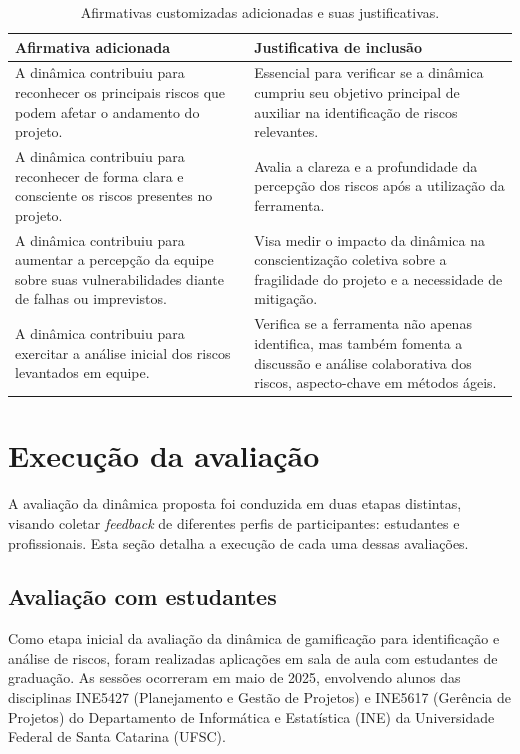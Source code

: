 \documentclass[
	12pt,
	openright,
	twoside,
	a4paper,
	english,
	brazil
	]{abntex2}
\begin{document}
\begin{table}[H]
  \centering
  \caption{Afirmativas customizadas adicionadas e suas justificativas.}
  \label{tab:afirmativas-adicionadas}
  \begin{tabular}{|p{}|p{}|}
  \hline
  \textbf{Afirmativa adicionada} & \textbf{Justificativa de inclusão} \\ \hline
  A dinâmica contribuiu para reconhecer os principais riscos que podem afetar o andamento do projeto. & Essencial para verificar se a dinâmica cumpriu seu objetivo principal de auxiliar na identificação de riscos relevantes. \\ \hline
  A dinâmica contribuiu para reconhecer de forma clara e consciente os riscos presentes no projeto. & Avalia a clareza e a profundidade da percepção dos riscos após a utilização da ferramenta. \\ \hline
  A dinâmica contribuiu para aumentar a percepção da equipe sobre suas vulnerabilidades diante de falhas ou imprevistos. & Visa medir o impacto da dinâmica na conscientização coletiva sobre a fragilidade do projeto e a necessidade de mitigação. \\ \hline
  A dinâmica contribuiu para exercitar a análise inicial dos riscos levantados em equipe. & Verifica se a ferramenta não apenas identifica, mas também fomenta a discussão e análise colaborativa dos riscos, aspecto-chave em métodos ágeis. \\ \hline
  \end{tabular}
\end{table}

\section{Execução da avaliação}

A avaliação da dinâmica proposta foi conduzida em duas etapas distintas, visando coletar \textit{feedback} de diferentes perfis de participantes: estudantes e profissionais. Esta seção detalha a execução de cada uma dessas avaliações.

\subsection{Avaliação com estudantes}

Como etapa inicial da avaliação da dinâmica de gamificação para identificação e análise de riscos, foram realizadas aplicações em sala de aula com estudantes de graduação. As sessões ocorreram em maio de 2025, envolvendo alunos das disciplinas INE5427 (Planejamento e Gestão de Projetos) e INE5617 (Gerência de Projetos) do Departamento de Informática e Estatística (INE) da Universidade Federal de Santa Catarina (UFSC).
\end{document}
